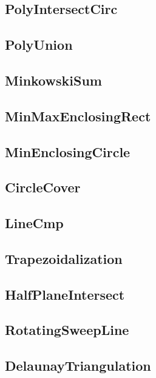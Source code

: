 	\subsection{PolyIntersectCirc}
	
	\subsection{PolyUnion}
	
	\subsection{MinkowskiSum}
	
	\subsection{MinMaxEnclosingRect}
	
	\subsection{MinEnclosingCircle}
	
	\subsection{CircleCover}
	
	\subsection{LineCmp}
	
	\subsection{Trapezoidalization}
	
	\subsection{HalfPlaneIntersect}
	
	\subsection{RotatingSweepLine}
	
	\subsection{DelaunayTriangulation}
	
